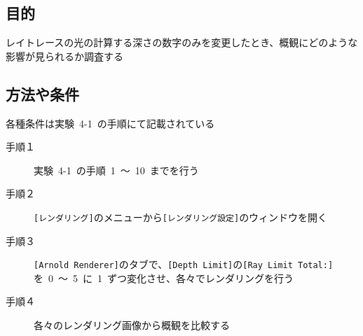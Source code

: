\documentclass[a4j]{jarticle}
\begin{document}
\subsection{目的}
%
レイトレースの光の計算する深さの数字のみを変更したとき、概観にどのような影響が見られるか調査する
%
\subsection{方法や条件}
%
各種条件は実験\ 4-1\ の手順にて記載されている
\begin{description}
  \item[手順１] 実験\ 4-1\ の手順\ 1\ ～\ 10\ までを行う
  \item[手順２] \verb|[レンダリング]|のメニューから\verb|[レンダリング設定]|のウィンドウを開く
  \item[手順３] \verb|[Arnold Renderer]|のタブで、\verb|[Depth Limit]|の\verb|[Ray Limit Total:]|を\ 0\ ～\ 5\ に\ 1\ ずつ変化させ、各々でレンダリングを行う
  \item[手順４] 各々のレンダリング画像から概観を比較する 
\end{description}
%
\end{document}
